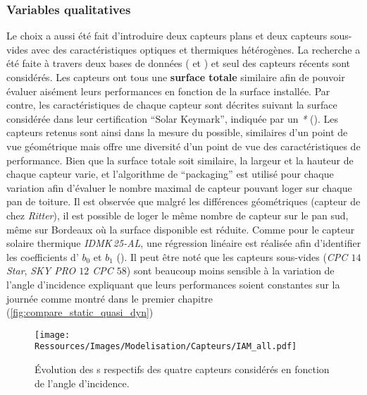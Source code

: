 \subsubsection{Variables qualitatives} %
\label{ssub:variables_qualitatives}
Le choix a aussi été fait d’introduire deux capteurs plans et deux capteurs sous-vides avec
des caractéristiques optiques et thermiques hétérogènes. La recherche a été faite
à travers deux bases de données ( et
) et seul des capteurs récents sont considérés.
Les capteurs ont tous une \textbf{surface totale} similaire afin de pouvoir évaluer
aisément leurs performances en fonction de la surface installée. Par contre, les caractéristiques
de chaque capteur sont décrites suivant la surface considérée dans leur certification \enquote{Solar Keymark},
indiquée par un \emph{*} (). Les capteurs
retenus sont ainsi dans la mesure du possible, similaires d’un point de vue géométrique
mais offre une diversité d’un point de vue des caractéristiques de performance. Bien que
la surface totale soit similaire, la largeur et la hauteur de chaque capteur varie, et
l’algorithme de \enquote{packaging} est utilisé pour chaque variation afin d’évaluer le
nombre maximal de capteur pouvant loger sur chaque pan de toiture. Il est observée que
malgré les différences géométriques (capteur de chez \textit{Ritter}), il est possible de
loger le même nombre de capteur sur le pan sud, même sur Bordeaux où la surface disponible
est réduite. Comme pour le capteur solaire thermique \textit{IDMK\,25-AL}, une régression
linéaire est réalisée afin d’identifier les coefficients d’ $b_{0}$ et $b_{1}$
(). Il peut être noté que les capteurs sous-vides
(\textit{CPC $14$ Star}, \textit{SKY PRO $12$ CPC $58$}) sont beaucoup moins sensible à la
variation de l’angle d’incidence expliquant que leurs performances soient constantes sur
la journée comme montré dans le premier chapitre (\ref{fig:compare_static_quasi_dyn})

\begin{figure}
    \centering
    \texttt{[image: Ressources/Images/Modelisation/Capteurs/IAM\_all.pdf]}
    \caption[Évolution des s en fonction de l’angle d’incidence]
    {Évolution des s respectifs des quatre capteurs considérés en fonction
     de l’angle d’incidence.}
    \label{fig:correlation_IAM_all}
\end{figure}

